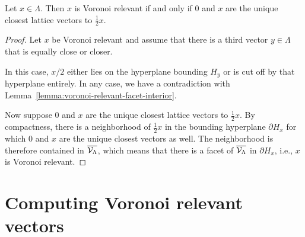 \begin{lemma}
  \label{lemma:voronoi-relevant-as-closest}
  Let $x \in \Lambda$.
  Then $x$ is Voronoi relevant if and only if
  $0$ and $x$ are the unique closest lattice vectors to $\frac{1}{2} x$.
\end{lemma}
\begin{proof}
  Let $x$ be Voronoi relevant and
  assume that there is a third vector $y \in \Lambda$ that is equally close or closer.
  \begin{center}
  \end{center}
  In this case, $x/2$ either lies on the hyperplane bounding $H_y$
  or is cut off by that hyperplane entirely.
  In any case, we have a contradiction with Lemma~\ref{lemma:voronoi-relevant-facet-interior}.

  Now suppose $0$ and $x$ are the unique closest lattice vectors to $\frac{1}{2} x$.
  By compactness, there is a neighborhood of $\frac{1}{2} x$
  in the bounding hyperplane $\partial H_x$
  for which $0$ and $x$ are the unique closest vectors as well.
  The neighborhood is therefore contained in $\overline{\mathcal{V}_\Lambda}$,
  which means that there is a facet of $\overline{\mathcal{V}_\Lambda}$ in $\partial H_x$,
  i.e., $x$ is Voronoi relevant.
\end{proof}



\section{Computing Voronoi relevant vectors}

